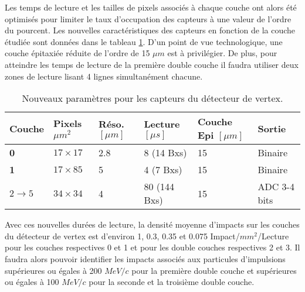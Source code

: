   \medskip
  
  Les temps de lecture et les tailles de pixels associ\'es \`a chaque couche ont alors \'et\'e optimis\'es pour limiter le taux d'occupation des capteurs \`a une valeur de l'ordre du pourcent. Les nouvelles caract\'eristiques des capteurs en fonction de la couche \'etudi\'ee sont donn\'ees dans le tableau \ref{tab:new_param_sensors_perspectives}. D'un point de vue technologique, une couche \'epitaxi\'ee r\'eduite de l'ordre de 15 $\mu m$ est \`a privil\'egier. De plus, pour atteindre les temps de lecture de la premi\`ere double couche il faudra utiliser deux zones de lecture lisant 4 lignes simultan\'ement chacune.
  
  \begin{table}[h]
   \small
   \centering
    \begin{tabular}{|l|l|l|l|l|l|}
     \hline
     \textbf{Couche}            & \textbf{Pixels $\mu m^2$} & \textbf{R\'eso. $[\mu m]$} & \textbf{Lecture $[\mu s]$} & \textbf{Couche Epi $[\mu m]$} & \textbf{Sortie} \\ \hline
     \textbf{0}                 & $17 \times 17$  & 2.8                           & 8 (14 Bxs)                    & 15                            & Binaire         \\ \hline
     \textbf{1}                 & $17 \times 85$  & 5                             & 4 (7 Bxs)                     & 15                            & Binaire         \\ \hline
     $2 \rightarrow 5$ & $34 \times 34$  & 4                             & 80 (144 Bxs)                  & 15                            & ADC 3-4 bits    \\ \hline
    \end{tabular}
    \caption{Nouveaux param\`etres pour les capteurs du d\'etecteur de vertex.}
    \label{tab:new_param_sensors_perspectives}
   \end{table}
  
  Avec ces nouvelles dur\'ees de lecture, la densit\'e moyenne d'impacts sur les couches du d\'etecteur de vertex est d'environ 1, 0.3, 0.35 et 0.075 Impact/$mm^2$/Lecture pour les couches respectives 0 et 1 et pour les double couches respectives 2 et 3. Il faudra alors pouvoir identifier les impacts associ\'es aux particules d'impulsions sup\'erieures ou \'egales \`a 200 $MeV/c$ pour la premi\`ere double couche et sup\'erieures ou \'egales \`a 100 $MeV/c$ pour la seconde et la troisi\`eme double couche.
  
  \medskip
  

